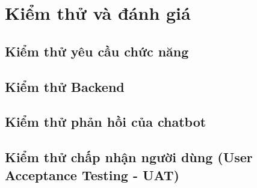 \newpage
\section{Kiểm thử và đánh giá}
% 
\subsection{Kiểm thử yêu cầu chức năng}


\subsection{Kiểm thử Backend}

\subsection{Kiểm thử phản hồi của chatbot}

\subsection{Kiểm thử chấp nhận người dùng (User Acceptance Testing - UAT)}

